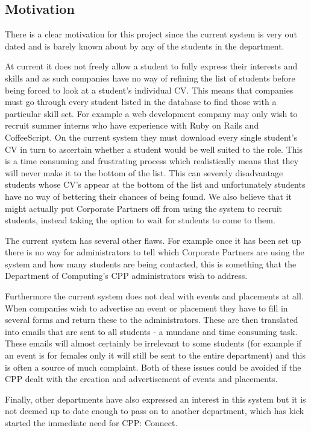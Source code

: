 \subsection{Motivation}
  There is a clear motivation for this project since the current system is very out dated and is barely known about by any of the students in the department.
  
  At current it does not freely allow a student to fully express their interests and skills and as such companies have no way of refining the list of students before being forced to look at a student's individual CV. This means that companies must go through every student listed in the database to find those with a particular skill set. For example a web development company may only wish to recruit summer interns who have experience with Ruby on Rails and CoffeeScript. On the current system they must download every single student's CV in turn to ascertain whether a student would be well suited to the role. This is a time consuming and frustrating process which realistically means that they will never make it to the bottom of the list. This can severely disadvantage students whose CV's appear at the bottom of the list and unfortunately students have no way of bettering their chances of being found.
  We also believe that it might actually put Corporate Partners off from using the system to recruit students, instead taking the option to wait for students to come to them.

  The current system has several other flaws. For example once it has been set up there is no way for administrators to tell which Corporate Partners are using the system and how many students are being contacted, this is something that the Department of Computing's CPP administrators wish to address. 

  Furthermore the current system does not deal with events and placements at all. When companies wish to advertise an event or placement they have to fill in several forms and return these to the administrators. These are then translated into emails that are sent to all students - a mundane and time consuming task. These emails will almost certainly be irrelevant to some students (for example if an event is for females only it will still be sent to the entire department) and this is often a source of much complaint. 
  Both of these issues could be avoided if the CPP dealt with the creation and advertisement of events and placements.

  Finally, other departments have also expressed an interest in this system but it is not deemed up to date enough to pass on to another department, which has kick started the immediate need for CPP: Connect.
